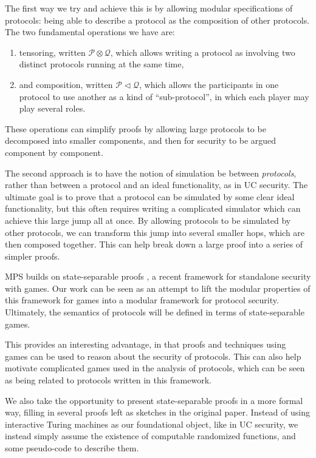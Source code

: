 The first way we try and achieve this is by allowing
modular specifications of protocols: being able to describe a protocol
as the composition of other protocols.
The two fundamental operations we have are:
\begin{enumerate}
\item tensoring, written $\mathscr{P} \otimes \mathscr{Q}$,
which allows writing a protocol as involving two distinct protocols
running at the same time,
\item and composition, written $\mathscr{P} \lhd \mathscr{Q}$,
which allows the participants in one protocol to use another
as a kind of ``sub-protocol'', in which each player may play
several roles.
\end{enumerate}
These operations can simplify proofs by allowing large protocols
to be decomposed into smaller components,
and then for security to be argued component by component.

The second approach is to have the
notion of simulation be between \emph{protocols},
rather than between a protocol and an ideal functionality,
as in UC security.
The ultimate goal is to prove that a protocol can be simulated
by some clear ideal functionality,
but this often requires writing a complicated simulator
which can achieve this large jump all at once.
By allowing protocols to be simulated by other protocols,
we can transform this jump into several smaller hops,
which are then composed together.
This can help break down a large proof into a series of simpler proofs.

MPS builds on state-separable proofs \cite{AC:BDFKK18},
a recent framework for standalone security with games.
Our work can be seen as an attempt to lift the modular
properties of this framework for games into a modular
framework for protocol security.
Ultimately, the semantics of protocols will be defined in terms
of state-separable games.

This provides an interesting advantage, in that proofs
and techniques using games can be used to reason
about the security of protocols.
This can also help motivate complicated games used in the analysis
of protocols, which can be seen as being related to protocols
written in this framework.

We also take the opportunity to present state-separable proofs
in a more formal way, filling in several proofs left as sketches
in the original paper.
Instead of using interactive Turing machines as our foundational
object, like in UC security,
we instead simply assume the existence of computable randomized functions,
and some pseudo-code to describe them.

